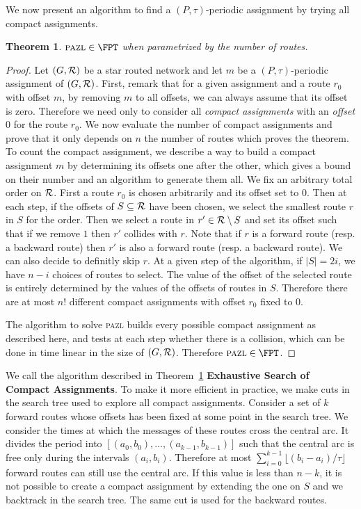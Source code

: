 \documentclass[10pt, conference, letterpaper]{IEEEtran}
\newtheorem{theorem}{Theorem}
\newcommand\pazl{\textsc{pazl}\xspace}
\begin{document}
We now present an algorithm to find a $(P,\tau)$-periodic assignment by trying all compact assignments.

\begin{theorem}\label{th:FPT}
$\pazl \in \FPT$ when parametrized by the number of routes.
\end{theorem}
\begin{proof}
Let $(G, {\cal R})$ be a star routed network and let $m$ be a $(P,\tau)$-periodic assignment of $(G, {\cal R})$. First, remark that for a given assignment and a route $r_0$ with offset $m$, by removing $m$ to all offsets, we can always assume that its offset is zero. Therefore we need only to consider all \emph{compact assignments} with an \emph{offset $0$} for the route $r_0$. 
We now evaluate the number of compact assignments and prove that it only depends
on $n$ the number of routes which proves the theorem. To count the compact assignment, we describe a way to build a compact assignment $m$ by determining its offsets one after the other, which gives a bound on their number and an algorithm to generate them all. We fix an arbitrary total order on ${\cal R}$.
First a route $r_0$ is chosen arbitrarily and its offset set to $0$. 
Then at each step, if the offsets of $S \subseteq  {\cal R}$ have been chosen,
we select the smallest route $r$ in $S$ for the order. 
Then we select a route in $r' \in {\cal R} \setminus S$ and set its offset such that 
if we remove $1$ then $r'$ collides with $r$. Note that if $r$ is a forward route (resp. a backward route) then $r'$ is also a forward route (resp. a backward route). We can also decide to definitly skip $r$. At a given step of the algorithm, if $|S| = 2i$, we have $n-i$ choices 
of routes to select. The value of the offset of the selected route is entirely determined by the values of the offsets of routes in $S$. Therefore there are at most $n!$ different compact assignments with offset $r_0$ fixed to $0$. 

The algorithm to solve \pazl builds every possible compact assignment as described here, and
tests at each step whether there is a collision, which can be done in time linear in the size of 
$(G, {\cal R})$. Therefore $\pazl \in \FPT$.
\end{proof}

We call the algorithm described in Theorem~\ref{th:FPT} \textbf{Exhaustive Search of Compact Assignments}. To make it more efficient in practice, we make cuts in the search tree used to explore all compact assignments. Consider a set of $k$ forward routes whose offsets has been fixed at some point in the search tree. We consider the times at which the messages of these routes cross the central arc. It divides the period into $[(a_0,b_0), \dots, (a_{k-1},b_{k-1})]$ such that the central arc is free only during the intervals $(a_i,b_i)$. Therefore at most $\displaystyle{ \sum_{i=0}^{k-1} \lfloor(b_{i} -a_i)/\tau\rfloor} $ forward routes can still use the central arc. If this value is less than $n - k$, it is not possible to create a compact assignment by extending the one on $S$ and we backtrack in the search tree. The same cut is used for the backward routes.
\end{document}
